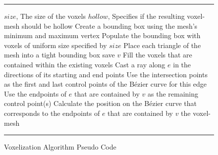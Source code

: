 \begin{figure}
  \hrule
  \vspace{6pt}
  \begin{algorithmic}
  \REQUIRE $size$, The size of the voxels
  \REQUIRE $hollow$, Specifies if the resulting voxel-mesh should be hollow
  \STATE Create a bounding box using the mesh's minimum and maximum vertex
  \STATE Populate the bounding box with voxels of uniform size specified by $size$
  \STATE Place each triangle of the mesh into a tight bounding box
          \STATE save $v$
      \ENDIF
  \ENDFOR
          \STATE Fill the voxels that are contained within the existing voxels
      \ENDFOR
  \ENDIF
          \STATE Cast a ray along $e$ in the directions of its starting and end points
          \STATE Use the intersection points as the first and last control points of the Bézier curve for this edge
          \STATE Use the endpoints of $e$ that are contained by $v$ as the remaining control point(s)
          \STATE Calculate the position on the Bézier curve that corresponds to the endpoints of $e$ that are contained by $v$
      \ENDFOR
  \ENDFOR
  \RETURN the voxel-mesh
  \end{algorithmic}
  \hrule
  \vspace{6pt}
  \caption{Voxelization Algorithm Pseudo Code}
 \label{fig:VoxelizationAlgorithm}
\end{figure}




